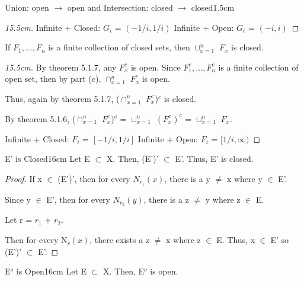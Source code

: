 \begin{ltheorem}{Union: open $\rightarrow$ open and
	Intersection: closed $\rightarrow$ closed}{1.5cm}
\begin{proof}[15.5cm]
				\vspace{0.1cm}

				{\color{purple} Infinite + Closed}: $G_i$ = $(-1/i,1/i)$
				\hfill
				{\color{purple} Infinite + Open}: $G_i$ = $(-i,i)$
			\end{proof}

		\item If $F_1, ... , F_n$ is a finite collection of closed sets,
		then $\cup_{x=1}^n$ $F_x$ is closed.

			\begin{proof}[15.5cm]
				By {\color{red} theorem 5.1.7}, any $F_x^c$ is open.
				Since $F_1^c, ... , F_n^c$ is a finite collection of
				open set, then by part (c), $\cap_{x=1}^n$ $F_x^c$ is open.

				Thus, again by {\color{red} theorem 5.1.7},
				($\cap_{x=1}^n$ $F_x^c$)$^c$ is closed.

				By {\color{red} theorem 5.1.6},
				($\cap_{x=1}^n$ $F_x^c$)$^c$ = $\cup_{x=1}^n$ $(F_x^c)^c$
				= $\cup_{x=1}^n$ $F_x$.

				\vspace{0.1cm}

				{\color{purple} Infinite + Closed}: $F_i$ = $[-1/i,1/i]$
				\hfill
				{\color{purple} Infinite + Open}: $F_i$ = $[1/i,\infty)$
			\end{proof}	 
	\end{ltheorem}

	\newpage



	\begin{wtheorem}{E' is Closed}{16cm}
		Let  E $\subset$ X. Then, (E')' $\subset$ E'.
		Thus, E' is closed.
	\end{wtheorem}
	
	\begin{proof}
		If x $\in$ (E')', then for every $N_{r_1}(x)$, there is a
		y $\not =$ x where y $\in$ E'.
		
		Since y $\in$ E', then for every $N_{r_2}(y)$, there is a
		z $\not =$ y where z $\in$ E.

		Let r = $r_1$ + $r_2$.

		Then for every N$_r(x)$, there exists a z $\not =$ x where
		z $\in$ E.
		Thus, x $\in$ E' so (E')' $\subset$ E'.
	\end{proof}

	\vspace{0.5cm}



	\begin{wtheorem}{E$^o$ is Open}{16cm}
		Let  E $\subset$ X. Then, E$^o$ is open. 
	\end{wtheorem}
	
